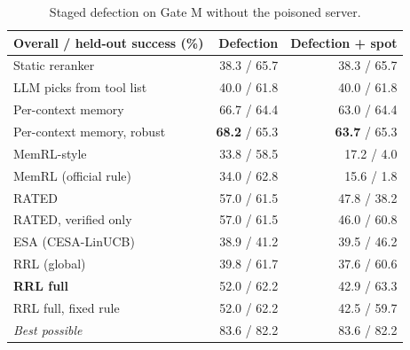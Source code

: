 \begin{table}[H]
\centering
\small
\begin{tabular}{lrr}
\toprule
Overall / held-out success (\%) & Defection & Defection + spot \\
\midrule
Static reranker & 38.3 / 65.7 & 38.3 / 65.7 \\
LLM picks from tool list & 40.0 / 61.8 & 40.0 / 61.8 \\
Per-context memory & 66.7 / 64.4 & 63.0 / 64.4 \\
Per-context memory, robust & \textbf{68.2} / 65.3 & \textbf{63.7} / 65.3 \\
MemRL-style & 33.8 / 58.5 & 17.2 / 4.0 \\
MemRL (official rule) & 34.0 / 62.8 & 15.6 / 1.8 \\
RATED & 57.0 / 61.5 & 47.8 / 38.2 \\
RATED, verified only & 57.0 / 61.5 & 46.0 / 60.8 \\
ESA (CESA-LinUCB) & 38.9 / 41.2 & 39.5 / 46.2 \\
\midrule
RRL (global) & 39.8 / 61.7 & 37.6 / 60.6 \\
\textbf{RRL full} & 52.0 / 62.2 & 42.9 / 63.3 \\
RRL full, fixed rule & 52.0 / 62.2 & 42.5 / 59.7 \\
\textit{Best possible} & 83.6 / 82.2 & 83.6 / 82.2 \\
\bottomrule
\end{tabular}
\caption{Staged defection on Gate M without the poisoned server.}
\label{tab:defectclean}
\end{table}
